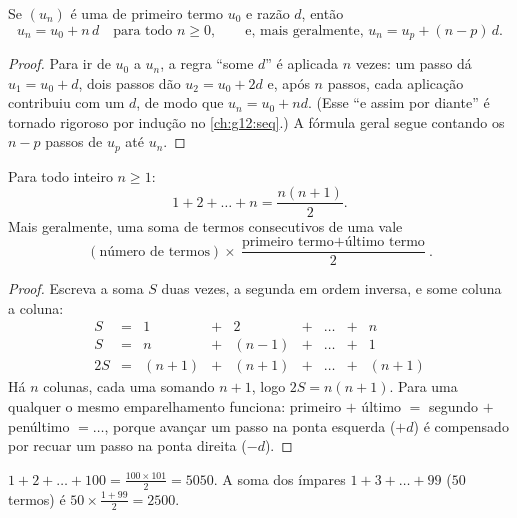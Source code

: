 \begin{theorem}\label{thm:g11:seq:arithgeneral}
Se $(u_n)$ é uma  de primeiro termo $u_0$ e razão
$d$, então
\[
u_n = u_0 + n\,d \quad \text{para todo } n \geq 0,
\qquad\text{e, mais geralmente, } u_n = u_p + (n - p)\,d .
\]
\end{theorem}

\begin{proof}
Para ir de $u_0$ a $u_n$, a regra ``some $d$'' é aplicada $n$ vezes: um
passo dá $u_1 = u_0 + d$, dois passos dão $u_2 = u_0 + 2d$ e, após $n$
passos, cada aplicação contribuiu com um $d$, de modo que
$u_n = u_0 + nd$. (Esse ``e assim por diante'' é tornado rigoroso por
indução no \cref{ch:g12:seq}.) A fórmula geral segue contando os $n - p$
passos de $u_p$ até $u_n$.
\end{proof}

\begin{theorem}\label{thm:g11:seq:intsum}
Para todo inteiro $n \geq 1$:
\[
1 + 2 + \dots + n = \frac{n(n+1)}{2}.
\]
Mais geralmente, uma soma de termos consecutivos de uma  vale
\[
(\text{número de termos}) \times
\frac{\text{primeiro termo} + \text{último termo}}{2}.
\]
\end{theorem}

\begin{proof}
Escreva a soma $S$ duas vezes, a segunda em ordem inversa, e some coluna
a coluna:
\[
\begin{array}{ccccccccc}
S & = & 1 & + & 2 & + & \dots & + & n\\
S & = & n & + & (n-1) & + & \dots & + & 1\\
\hline
2S & = & (n+1) & + & (n+1) & + & \dots & + & (n+1)
\end{array}
\]
Há $n$ colunas, cada uma somando $n + 1$, logo $2S = n(n+1)$. Para uma
 qualquer o mesmo emparelhamento funciona: primeiro
$+$ último $=$ segundo $+$ penúltimo $= \dots$, porque avançar um passo
na ponta esquerda ($+d$) é compensado por recuar um passo na ponta
direita ($-d$).
\end{proof}

\begin{example}
$1 + 2 + \dots + 100 = \frac{100 \times 101}{2} = 5050$. A soma dos
ímpares $1 + 3 + \dots + 99$ ($50$ termos) é
$50 \times \frac{1 + 99}{2} = 2500$.
\end{example}

